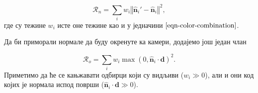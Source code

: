 \documentclass[12pt, a4paper, twoside]{book}
\numberwithin{equation}{chapter}
\numberwithin{theorem}{section}
\numberwithin{definition}{section}
\numberwithin{definitionChapter}{chapter}
\begin{document}
	\begin{equation}
		\mathcal{R}_n = \sum_i w_i \left\Vert \hat{\mathbf{n}}_i' - \hat{\mathbf{n}}_i \right\Vert^2,
	\end{equation}
где су тежине $w_i$ исте оне тежине као и у једначини $\ref{eqn-color-combination}$.

Да би приморали нормале да буду окренуте ка камери, додајемо још један члан

	\begin{equation}
		\mathcal{R}_o = \sum_i w_i \max(0, \hat{\mathbf{n}}_i \cdot \mathbf{d})^2.
	\end{equation}
Приметимо да ће се кањжавати одбирци који су видљиви ($w_i \gg 0$), али и они код којих
је нормала испод површи ($\hat{\mathbf{n}}_i \cdot \mathbf{d} \gg 0$).

\end{document}
